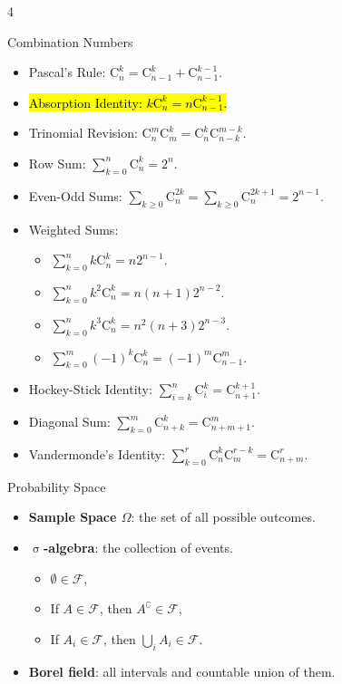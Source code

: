 \documentclass[landscape,a4paper]{article}
\renewcommand{\emph}[1]{\hl{#1}}
\newcommand{\C}[2]{\mathrm{C}_{#1}^{#2}}
\begin{document}
	
	\fontsize{7pt}{8pt}\selectfont 

	
	\begin{multicols*}{4}
		\begin{card}{Combination Numbers}
			\begin{itemize}
				\item Pascal's Rule: $\C{n}{k}=\C{n-1}{k}+\C{n-1}{k-1}$.
				\item \emph{Absorption Identity: $k\C{n}{k}=n\C{n-1}{k-1}$.}
				\item Trinomial Revision: $\C{n}{m}\C{m}{k}=\C{n}{k}\C{n-k}{m-k}$.
				\item Row Sum: $\sum_{k=0}^{n}\C{n}{k}=2^n$.
				\item Even-Odd Sums: $\sum_{k\ge 0} \C{n}{2k}=\sum_{k\ge 0}\C{n}{2k+1}=2^{n-1}$.
				\item Weighted Sums:
				\begin{itemize} 
					\item $\sum_{k=0}^{n}k\C{n}{k}=n2^{n-1}$.
				\item $\sum_{k=0}^{n}k^2\C{n}{k}=n(n+1)2^{n-2}$.
				\item  $\sum_{k=0}^{n}k^3\C{n}{k}=n^2(n+3)2^{n-3}$.
				\item  $\sum_{k=0}^m(-1)^k\C{n}{k}=(-1)^m\C{n-1}{m}$.
				\end{itemize}
				\item Hockey-Stick Identity: $\sum_{i=k}^n\C{i}{k}=\C{n+1}{k+1}$.
				\item Diagonal Sum: $\sum_{k=0}^m \C{n+k}{k}=\C{n+m+1}{m}$.
				\item Vandermonde's Identity: $\sum_{k=0}^r \C{n}{k}\C{m}{r-k}=\C{n+m}{r}$.
			\end{itemize}
		\end{card}
		\begin{card}{Probability Space}
			\begin{itemize}
				\item \textbf{Sample Space $\Omega$}: the set of all possible outcomes.
				\item \textbf{$\upsigma$-algebra}: the collection of events.
				\begin{itemize}
					\item $\emptyset\in\mathcal F$,
					\item If $A\in\mathcal F$, then $A^\complement\in \mathcal F$,
					\item If $A_i\in\mathcal F$, then $\bigcup_i A_i\in\mathcal F$.
				\end{itemize}
				\item \textbf{Borel field}: all intervals and countable union of them.

\end{itemize}
\end{card}
\end{multicols*}
\end{document}
